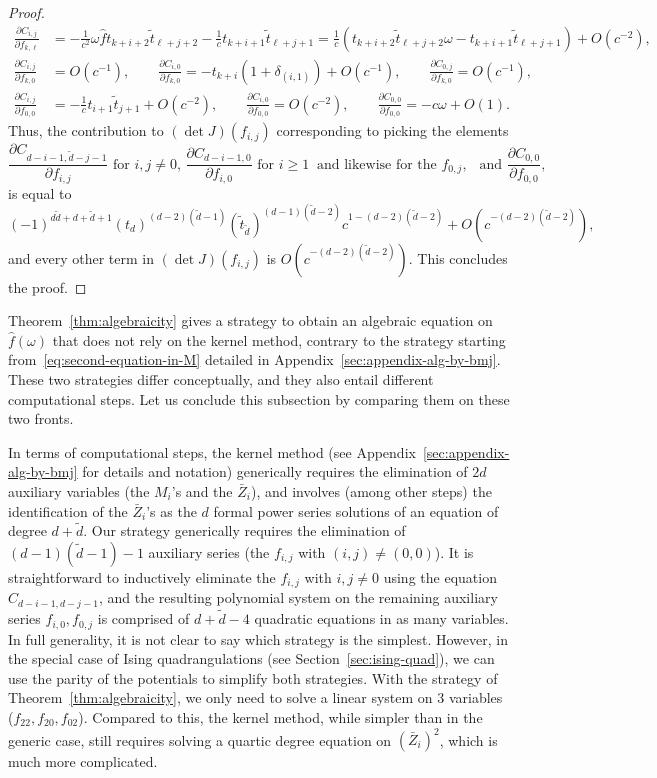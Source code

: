 \documentclass{scrartcl}
\newcommand\wt[1]{\widetilde{#1}}
\newcommand\wh[1]{\widehat{#1}}
\begin{document}
\begin{proof}
\begin{align*}
\frac{\partial C_{i,j}}{\partial f_{k,\ell}}&=-\frac{1}{c^2}\omega\wh{f}t_{k+i+2}\wt{t}_{\ell+j+2}-\frac{1}{c}t_{k+i+1}\wt{t}_{\ell+j+1}=\frac{1}{c}(t_{k+i+2}\wt{t}_{\ell+j+2}\omega-t_{k+i+1}\wt{t}_{\ell+j+1})+O(c^{-2}),\\
\frac{\partial C_{i,j}}{\partial f_{k,0}}&=O(c^{-1}), \qquad \frac{\partial C_{i,0}}{\partial f_{k,0}}=-t_{k+i}(1+\delta_{(i,1)})+O(c^{-1}), \qquad \frac{\partial C_{0,j}}{\partial f_{k,0}}=O(c^{-1}),\\
\frac{\partial C_{i,j}}{\partial f_{0,0}}&=-\frac{1}{c}t_{i+1}\wt{t}_{j+1}+O(c^{-2}), \qquad \frac{\partial C_{i,0}}{\partial f_{0,0}}=O(c^{-2}), \qquad \frac{\partial C_{0,0}}{\partial f_{0,0}}=-c\omega+O(1).
\end{align*}
Thus, the contribution to $(\det J)(f_{i,j})$ corresponding to picking the elements 
\[
\frac{\partial C_{d-i-1,\wt{d}-j-1}}{\partial f_{i,j}} \text{ for } i,j \neq 0, \, \frac{\partial C_{d-i-1,0}}{\partial f_{i,0}} \text{ for } i \geq 1  \ \text{ and likewise for the } f_{0,j}, \ \ \text{ and } \frac{\partial C_{0,0}}{\partial f_{0,0}},
\]
is equal to 
\[
(-1)^{d\wt{d}+d+\wt{d}+1}(t_d)^{(d-2)(\wt d -1)}(\wt t_{\wt d})^{(d-1)(\wt d -2)}c^{1-(d-2)(\wt d -2)}+O(c^{-(d-2)(\wt d -2)}),
\]
and every other term in $(\det J)(f_{i,j})$ is $O(c^{-(d-2)(\wt d -2)})$. This concludes the proof.
\end{proof}

Theorem~\ref{thm:algebraicity} gives a strategy to obtain an algebraic equation on $\wh{f}(\omega)$ that does not rely on the kernel method, contrary to the strategy starting from~\eqref{eq:second-equation-in-M} detailed in Appendix~\ref{sec:appendix-alg-by-bmj}. These two strategies differ conceptually, and they also entail different computational steps. Let us conclude this subsection by comparing them on these two fronts.

In terms of computational steps, the kernel method (see Appendix~\ref{sec:appendix-alg-by-bmj} for details and notation) generically requires the elimination of $2d$ auxiliary variables (the $M_i$'s and the $\bar{Z}_i$), and involves (among other steps) the identification of the  $\bar{Z}_i$'s as the $d$ formal power series solutions of an equation of degree $d+\wt d$. Our strategy generically requires the elimination of $(d-1)(\wt d -1)-1$ auxiliary series (the $f_{i,j}$ with $(i,j)\neq (0,0)$). It is straightforward to inductively eliminate the $f_{i,j}$ with $i,j \neq 0$ using the equation $C_{d-i-1,d-j-1}$, and the resulting polynomial system on the remaining auxiliary series $f_{i,0},f_{0,j}$ is comprised of $d+\wt{d}-4$ quadratic equations in as many variables. In full generality, it is not clear to say which strategy is the simplest. However, in the special case of Ising quadrangulations (see Section~\ref{sec:ising-quad}), we can use the parity of the potentials to simplify both strategies. With the strategy of Theorem~\ref{thm:algebraicity}, we only need to solve a linear system on 3 variables ($f_{22},f_{20},f_{02}$). Compared to this, the kernel method, while simpler than in the generic case, still requires solving a quartic degree equation on $(\bar{Z}_i)^2$, which is much more complicated.
\end{document}
